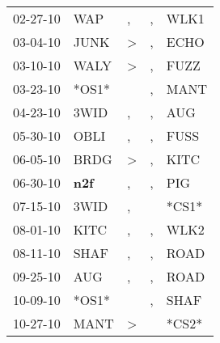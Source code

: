 \begin{supertabular}{p{0.07\textwidth}p{0.06\textwidth}p{0.02\textwidth}p{0.02\textwidth}p{0.06\textwidth}}
          02-27-10\textsuperscript{} &            WAP\textsuperscript{} &                , &                , &           WLK1\textsuperscript{} \\
          03-04-10\textsuperscript{} &           JUNK\textsuperscript{} &     \textgreater &                , &           ECHO\textsuperscript{} \\
          03-10-10\textsuperscript{} &           WALY\textsuperscript{} &     \textgreater &                , &           FUZZ\textsuperscript{} \\
          03-23-10\textsuperscript{} &                            *OS1* &                  &                , &           MANT\textsuperscript{} \\
          04-23-10\textsuperscript{} &           3WID\textsuperscript{} &                , &                , &            AUG\textsuperscript{} \\
          05-30-10\textsuperscript{} &           OBLI\textsuperscript{} &                , &                , &           FUSS\textsuperscript{} \\
          06-05-10\textsuperscript{} &           BRDG\textsuperscript{} &     \textgreater &                , &           KITC\textsuperscript{} \\
          06-30-10\textsuperscript{} &   \textbf{n2f\textsuperscript{}} &                , &                , &            PIG\textsuperscript{} \\
          07-15-10\textsuperscript{} &           3WID\textsuperscript{} &                , &                  &                            *CS1* \\
          08-01-10\textsuperscript{} &           KITC\textsuperscript{} &                , &                , &           WLK2\textsuperscript{} \\
          08-11-10\textsuperscript{} &           SHAF\textsuperscript{} &                , &                , &           ROAD\textsuperscript{} \\
          09-25-10\textsuperscript{} &            AUG\textsuperscript{} &                , &                , &           ROAD\textsuperscript{} \\
          10-09-10\textsuperscript{} &                            *OS1* &                  &                , &           SHAF\textsuperscript{} \\
          10-27-10\textsuperscript{} &           MANT\textsuperscript{} &     \textgreater &                  &                            *CS2* \\

\end{supertabular}
